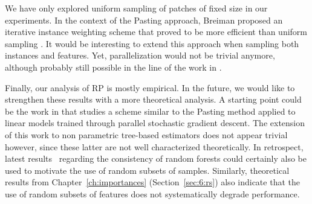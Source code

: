 We have only explored uniform sampling of patches of fixed size in our
experiments. In the context of the Pasting approach, Breiman proposed
an iterative instance weighting scheme that proved to be more
efficient than uniform sampling \citep{breiman:1999}. It would be
interesting to extend this approach when sampling both instances and
features. Yet, parallelization would not be trivial anymore, although
probably still possible in the line of the work in \citep{chawla:2004}.

Finally, our analysis of RP is
mostly empirical. In the future, we would like to strengthen these
results with a more theoretical analysis. A starting point could be
the work in \citep{zinkevich:2010} that studies a scheme similar to the
Pasting method applied to linear models trained through parallel
stochastic gradient descent. The extension of this work to non
parametric tree-based estimators does not appear trivial however,
since these latter are not well characterized
theoretically. In retrospect, latest results~\citep{scornet:2014} regarding the consistency
of random forests could certainly also be used to motivate the use of random subsets of samples.
Similarly, theoretical results from Chapter~\ref{ch:importances} (Section~\ref{sec:6:rs})
also indicate that the use of random subsets of features does not systematically
degrade performance.
